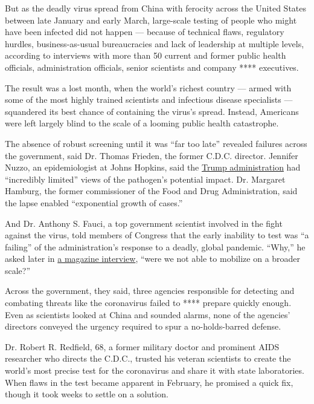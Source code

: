 But as the deadly virus spread from China with ferocity across the
United States between late January and early March, large-scale testing
of people who might have been infected did not happen --- because of
technical flaws, regulatory hurdles, business-as-usual bureaucracies and
lack of leadership at multiple levels, according to interviews with more
than 50 current and former public health officials, administration
officials, senior scientists and company **** executives.

The result was a lost month, when the world's richest country --- armed
with some of the most highly trained scientists and infectious disease
specialists --- squandered its best chance of containing the virus's
spread. Instead, Americans were left largely blind to the scale of a
looming public health catastrophe.

The absence of robust screening until it was ``far too late'' revealed
failures across the government, said Dr. Thomas Frieden, the former
C.D.C. director. Jennifer Nuzzo, an epidemiologist at Johns Hopkins,
said the
\href{https://www.nytimes3xbfgragh.onion/2020/04/01/us/politics/coronavirus-trump.html}{Trump
administration} had ``incredibly limited'' views of the pathogen's
potential impact. Dr. Margaret Hamburg, the former commissioner of the
Food and Drug Administration, said the lapse enabled ``exponential
growth of cases.''

And Dr. Anthony S. Fauci, a top government scientist involved in the
fight against the virus, told members of Congress that the early
inability to test was ``a failing'' of the administration's response to
a deadly, global pandemic. ``Why,'' he asked later in
\href{https://www.sciencemag.org/news/2020/03/i-m-going-keep-pushing-anthony-fauci-tries-make-white-house-listen-facts-pandemic}{a
magazine interview}, ``were we not able to mobilize on a broader
scale?''

Across the government, they said, three agencies responsible for
detecting and combating threats like the coronavirus failed to ****
prepare quickly enough. Even as scientists looked at China and sounded
alarms, none of the agencies' directors conveyed the urgency required to
spur a no-holds-barred defense.

Dr. Robert R. Redfield, 68, a former military doctor and prominent AIDS
researcher who directs the C.D.C., trusted his veteran scientists to
create the world's most precise test for the coronavirus and share it
with state laboratories. When flaws in the test became apparent in
February, he promised a quick fix, though it took weeks to settle on a
solution.

